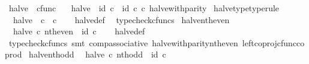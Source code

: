 \begin{isabellebody}
\isamarkupfalse%
%
\endisatagproof
{\isafoldproof}%
%
\isadelimproof
\isanewline
%
\endisadelimproof
\isanewline
{}\isamarkupfalse%
\ halve\ {\isacharcolon}{\kern0pt}{\isacharcolon}{\kern0pt}\ {\isachardoublequoteopen}cfunc{\isachardoublequoteclose}\ \isanewline
\ \ {\isachardoublequoteopen}halve\ {\isacharequal}{\kern0pt}\ {\isacharparenleft}{\kern0pt}id\ {\isasymnat}\isactrlsub c\ {\isasymamalg}\ id\ {\isasymnat}\isactrlsub c{\isacharparenright}{\kern0pt}\ {\isasymcirc}\isactrlsub c\ halve{\isacharunderscore}{\kern0pt}with{\isacharunderscore}{\kern0pt}parity{\isachardoublequoteclose}\isanewline
\isanewline
{}\isamarkupfalse%
\ halve{\isacharunderscore}{\kern0pt}type{\isacharbrackleft}{\kern0pt}type{\isacharunderscore}{\kern0pt}rule{\isacharbrackright}{\kern0pt}{\isacharcolon}{\kern0pt}\isanewline
\ \ {\isachardoublequoteopen}halve\ {\isacharcolon}{\kern0pt}\ {\isasymnat}\isactrlsub c\ {\isasymrightarrow}\ {\isasymnat}\isactrlsub c{\isachardoublequoteclose}\isanewline
%
\isadelimproof
\ \ %
\endisadelimproof
%
\isatagproof
{}\isamarkupfalse%
\ halve{\isacharunderscore}{\kern0pt}def\ \isamarkupfalse%
\ typecheck{\isacharunderscore}{\kern0pt}cfuncs%
\endisatagproof
{\isafoldproof}%
%
\isadelimproof
\isanewline
%
\endisadelimproof
\isanewline
{}\isamarkupfalse%
\ halve{\isacharunderscore}{\kern0pt}nth{\isacharunderscore}{\kern0pt}even{\isacharcolon}{\kern0pt}\isanewline
\ \ {\isachardoublequoteopen}halve\ {\isasymcirc}\isactrlsub c\ nth{\isacharunderscore}{\kern0pt}even\ {\isacharequal}{\kern0pt}\ id\ {\isasymnat}\isactrlsub c{\isachardoublequoteclose}\isanewline
%
\isadelimproof
\ \ %
\endisadelimproof
%
\isatagproof
{}\isamarkupfalse%
\ halve{\isacharunderscore}{\kern0pt}def\ \isamarkupfalse%
\ {\isacharparenleft}{\kern0pt}typecheck{\isacharunderscore}{\kern0pt}cfuncs{\isacharcomma}{\kern0pt}\ smt\ comp{\isacharunderscore}{\kern0pt}associative{}\ halve{\isacharunderscore}{\kern0pt}with{\isacharunderscore}{\kern0pt}parity{\isacharunderscore}{\kern0pt}nth{\isacharunderscore}{\kern0pt}even\ left{\isacharunderscore}{\kern0pt}coproj{\isacharunderscore}{\kern0pt}cfunc{\isacharunderscore}{\kern0pt}coprod{\isacharparenright}{\kern0pt}%
\endisatagproof
{\isafoldproof}%
%
\isadelimproof
\isanewline
%
\endisadelimproof
\isanewline
{}\isamarkupfalse%
\ halve{\isacharunderscore}{\kern0pt}nth{\isacharunderscore}{\kern0pt}odd{\isacharcolon}{\kern0pt}\isanewline
\ \ {\isachardoublequoteopen}halve\ {\isasymcirc}\isactrlsub c\ nth{\isacharunderscore}{\kern0pt}odd\ {\isacharequal}{\kern0pt}\ id\ {\isasymnat}\isactrlsub c{\isachardoublequoteclose}\isanewline

\end{isabellebody}
